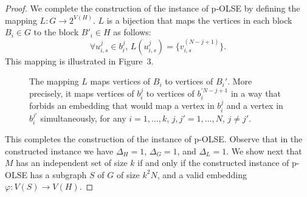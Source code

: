 \documentclass[11pt]{article}
\let\phi=\varphi
\begin{document}
\begin{proof}
We complete the construction of the instance of p-\textsc{OLSE} by defining
the mapping $L: G \to 2^{V(H)}$. $L$ is a bijection that maps the vertices in each block
$B_i \in G$ to the block $B'_i \in H$ as follows:
$$
\forall u_{i,s}^j \in b_i^{j} \mbox{, } L(u_{i,s}^j) = \{v_{i,s}^{(N-j+1)}\}.
$$
This mapping is illustrated in Figure~3.

\begin{figure}
\label{fi:map}
\caption{The mapping $L$ maps vertices of $B_i$ to vertices of $B_i'$. More
precisely, it maps vertices of $b_i^j$ to vertices of $b_i^{'N-j+1}$ in a way
that forbids an embedding that would map a vertex in $b_i^j$ and a vertex in
$b_i^{j'}$ simultaneously, for any $i=1,\dots,k$, $j,j'=1,\dots,N$, $j \not= j'$.}
\end{figure}


This completes the construction of the instance of p-OLSE. Observe that in the constructed instance we have $\Delta_H=1$, $\Delta_G=1$, and $\Delta_L=1$. We show next that $M$ has an independent set of size $k$ if and only if the constructed instance of p-OLSE has a subgraph $S$ of $G$ of size $k^2N$, and a valid embedding
$\phi: V(S) \to V(H)$.


\end{proof}
\end{document}
